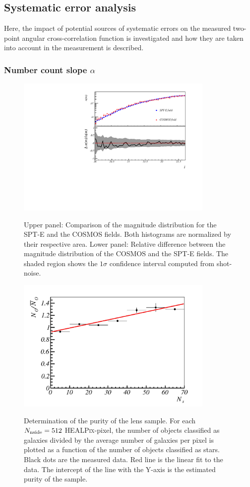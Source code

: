 \subsection{Systematic error analysis}
\label{sec:sys}
Here, the impact of potential sources of systematic errors on the measured two-point angular cross-correlation function is investigated and how they are taken into account in the measurement is described.

\subsubsection{Number count slope $\alpha$}
    
\begin{figure}
\begin{center}
\includegraphics[width=0.85\textwidth]{./figures/SPTE_SNe.pdf}
\caption{Upper panel: Comparison of the magnitude distribution for the SPT-E and the COSMOS fields. Both histograms are normalized by their respective area. Lower panel: Relative difference between the magnitude distribution of the COSMOS and the SPT-E fields. The shaded region shows the $1\sigma$ confidence interval computed from shot-noise.}
\label{fig:ndmSN}
	\includegraphics[width=0.85\textwidth]{./figures/purity_lens.pdf}
    \caption{Determination of the purity of the lens sample. For each $N_{\rm nside}=512$ {\scshape HEALPix}-pixel, the number of objects classified as galaxies divided by the average number of galaxies per pixel is plotted as a function of the  number of objects classified as stars. Black dots are the measured data. Red line is the linear fit to the data. The intercept of the line with the Y-axis is the estimated purity of the sample.}
    \label{fig:purity}
    \end{center}
\end{figure}

